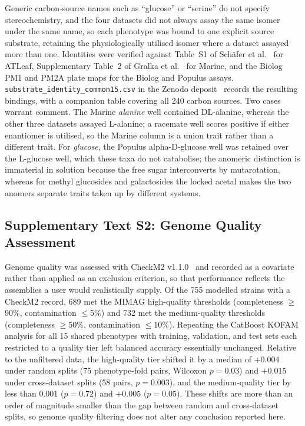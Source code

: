 Generic carbon-source names such as ``glucose'' or ``serine'' do not specify stereochemistry, and the four datasets did not always assay the same isomer under the same name, so each phenotype was bound to one explicit source substrate, retaining the physiologically utilised isomer where a dataset assayed more than one.
Identities were verified against Table~S1 of Sch\"afer et al.~\cite{Schafer2023-nk} for ATLeaf, Supplementary Table~2 of Gralka et al.~\cite{Gralka2023-ft} for Marine, and the Biolog PM1 and PM2A plate maps for the Biolog and Populus assays. \texttt{substrate\_identity\_common15.csv} in the Zenodo deposit~\cite{ZenodoDeposit} records the resulting bindings, with a companion table covering all 240 carbon sources.
Two cases warrant comment.
The Marine \emph{alanine} well contained DL-alanine, whereas the other three datasets assayed L-alanine; a racemate well scores positive if either enantiomer is utilised, so the Marine column is a union trait rather than a different trait.
For \emph{glucose}, the Populus alpha-D-glucose well was retained over the L-glucose well, which these taxa do not catabolise; the anomeric distinction is immaterial in solution because the free sugar interconverts by mutarotation, whereas for methyl glucosides and galactosides the locked acetal makes the two anomers separate traits taken up by different systems.

\subsection*{Supplementary Text S2: Genome Quality Assessment}

Genome quality was assessed with CheckM2 v1.1.0~\cite{Chklovski2023CheckM2} and recorded as a covariate rather than applied as an exclusion criterion, so that performance reflects the assemblies a user would realistically supply.
Of the 755 modelled strains with a CheckM2 record, 689 met the MIMAG high-quality thresholds (completeness $\geq$90\%, contamination $\leq$5\%) and 732 met the medium-quality thresholds (completeness $\geq$50\%, contamination $\leq$10\%).
Repeating the CatBoost KOFAM analysis for all 15 shared phenotypes with training, validation, and test sets each restricted to a quality tier left balanced accuracy essentially unchanged.
Relative to the unfiltered data, the high-quality tier shifted it by a median of $+0.004$ under random splits (75 phenotype-fold pairs, Wilcoxon $p = 0.03$) and $+0.015$ under cross-dataset splits (58 pairs, $p = 0.003$), and the medium-quality tier by less than 0.001 ($p = 0.72$) and $+0.005$ ($p = 0.05$).
These shifts are more than an order of magnitude smaller than the gap between random and cross-dataset splits, so genome quality filtering does not alter any conclusion reported here.

